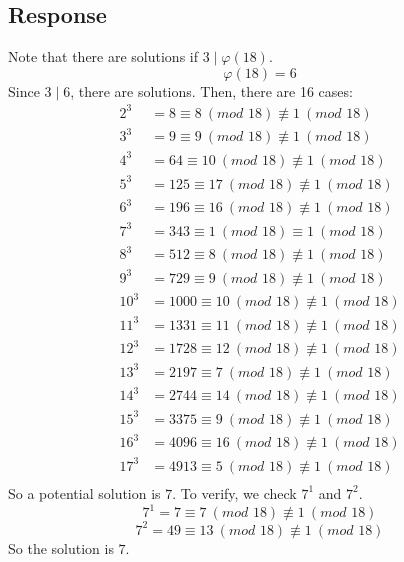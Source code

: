 \documentclass[13pt]{article}
\begin{document}
\subsection*{Response}
Note that there are solutions if $3 \mid \varphi (18)$.
\[\varphi (18) = 6\]
Since $3 \mid 6$, there are solutions. Then, there are 16 cases:
\begin{align*}
  2^3 &= 8 \equiv 8 \ (\textit{mod } 18) \not\equiv 1 \ (\textit{mod } 18) \\
  3^3 &= 9 \equiv 9 \ (\textit{mod } 18) \not\equiv 1 \ (\textit{mod } 18) \\
  4^3 &= 64 \equiv 10 \ (\textit{mod } 18) \not\equiv 1 \ (\textit{mod } 18) \\
  5^3 &= 125 \equiv 17 \ (\textit{mod } 18) \not\equiv 1 \ (\textit{mod } 18) \\
  6^3 &= 196 \equiv 16 \ (\textit{mod } 18) \not\equiv 1 \ (\textit{mod } 18) \\
  7^3 &= 343 \equiv 1 \ (\textit{mod } 18) \equiv 1 \ (\textit{mod } 18) \\
  8^3 &= 512 \equiv 8 \ (\textit{mod } 18) \not\equiv 1 \ (\textit{mod } 18) \\
  9^3 &= 729 \equiv 9 \ (\textit{mod } 18) \not\equiv 1 \ (\textit{mod } 18) \\
  10^3 &= 1000 \equiv 10 \ (\textit{mod } 18) \not\equiv 1 \ (\textit{mod } 18) \\
  11^3 &= 1331 \equiv 11 \ (\textit{mod } 18) \not\equiv 1 \ (\textit{mod } 18) \\
  12^3 &= 1728 \equiv 12 \ (\textit{mod } 18) \not\equiv 1 \ (\textit{mod } 18) \\
  13^3 &= 2197 \equiv 7 \ (\textit{mod } 18) \not\equiv 1 \ (\textit{mod } 18) \\
  14^3 &= 2744 \equiv 14 \ (\textit{mod } 18) \not\equiv 1 \ (\textit{mod } 18) \\
  15^3 &= 3375 \equiv 9 \ (\textit{mod } 18) \not\equiv 1 \ (\textit{mod } 18) \\
  16^3 &= 4096 \equiv 16 \ (\textit{mod } 18) \not\equiv 1 \ (\textit{mod } 18) \\
  17^3 &= 4913 \equiv 5 \ (\textit{mod } 18) \not\equiv 1 \ (\textit{mod } 18) \\
\end{align*}
So a potential solution is $7$. To verify, we check $7^1$ and $7^2$.
\[7^1 = 7 \equiv 7 \ (\textit{mod } 18) \not\equiv 1 \ (\textit{mod } 18)\]
\[7^2 = 49 \equiv 13 \ (\textit{mod } 18) \not\equiv 1 \ (\textit{mod } 18)\]
So the solution is $7$.
\end{document}
